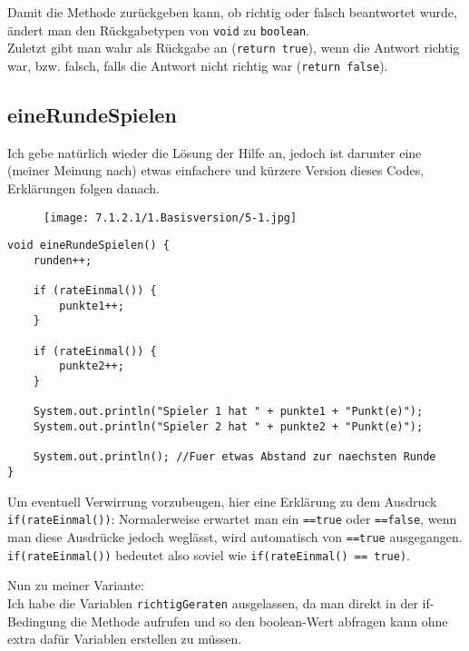 \documentclass{scrartcl}   %
\begin{document}
\newpage

Damit die Methode zurückgeben kann, ob richtig oder falsch beantwortet wurde, ändert man den Rückgabetypen von \texttt{void} zu \texttt{boolean}.\\
Zuletzt gibt man \glqq wahr\grqq{} als Rückgabe an (\texttt{return true}), wenn die Antwort richtig war, bzw. \glqq falsch\grqq{}, falls die Antwort nicht richtig war (\texttt{return false}).

\subsection{eineRundeSpielen}

Ich gebe natürlich wieder die Lösung der Hilfe an, jedoch ist darunter eine (meiner Meinung nach) etwas einfachere und kürzere Version dieses Codes, Erklärungen folgen danach.\\

\begin{figure}[ht]
	\centering
	\texttt{[image: 7.1.2.1/1.Basisversion/5-1.jpg]}
\end{figure}

\newpage

\begin{lstlisting}
void eineRundeSpielen() {
    runden++;
    
    if (rateEinmal()) {
        punkte1++;
    }
    
    if (rateEinmal()) {
        punkte2++;
    }
    
    System.out.println("Spieler 1 hat " + punkte1 + "Punkt(e)");
    System.out.println("Spieler 2 hat " + punkte2 + "Punkt(e)");
    
    System.out.println(); //Fuer etwas Abstand zur naechsten Runde
}
\end{lstlisting}

Um eventuell Verwirrung vorzubeugen, hier eine Erklärung zu dem Ausdruck \texttt{if(rateEinmal())}:
Normalerweise erwartet man ein \texttt{==true} oder \texttt{==false}, wenn man diese Ausdrücke jedoch weglässt, wird automatisch von \texttt{==true} ausgegangen.\\
\texttt{if(rateEinmal())} bedeutet also soviel wie \texttt{if(rateEinmal() == true)}.

Nun zu meiner Variante:\\
Ich habe die Variablen \texttt{richtigGeraten} ausgelassen, da man direkt in der if-Bedingung die Methode aufrufen und so den boolean-Wert abfragen kann ohne extra dafür Variablen erstellen zu müssen.
\end{document}
